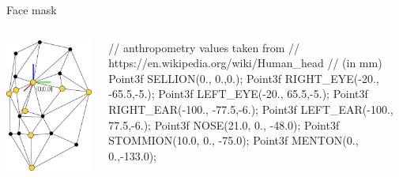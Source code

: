 \documentclass[compress]{beamer}
\begin{document}
\begin{frame}[fragile]{Face mask}

    \begin{columns}
        \begin{column}{0.4\linewidth}
            \begin{center}
                \includegraphics[width=\linewidth]{face_mask}
            \end{center}
        \end{column}
        \begin{column}{0.6\linewidth}
\begin{cppcode}
// anthropometry values taken from
// https://en.wikipedia.org/wiki/Human_head
// (in mm)
Point3f SELLION(0., 0.,0.);
Point3f RIGHT_EYE(-20., -65.5,-5.);
Point3f LEFT_EYE(-20., 65.5,-5.);
Point3f RIGHT_EAR(-100., -77.5,-6.);
Point3f LEFT_EAR(-100., 77.5,-6.);
Point3f NOSE(21.0, 0., -48.0);
Point3f STOMMION(10.0, 0., -75.0);
Point3f MENTON(0., 0.,-133.0);
\end{cppcode}
        \end{column}
    \end{columns}
\end{frame}
\end{document}
